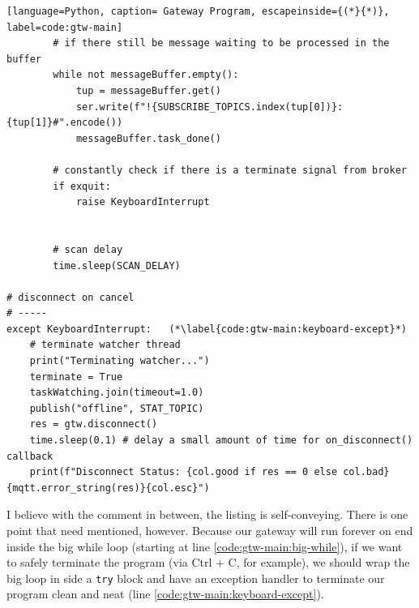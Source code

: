 \begin{lstlisting}[language=Python, caption= Gateway Program, escapeinside={(*}{*)}, label=code:gtw-main]
        # if there still be message waiting to be processed in the buffer
        while not messageBuffer.empty():
            tup = messageBuffer.get()
            ser.write(f"!{SUBSCRIBE_TOPICS.index(tup[0])}:{tup[1]}#".encode())
            messageBuffer.task_done()

        # constantly check if there is a terminate signal from broker
        if exquit:
            raise KeyboardInterrupt


        # scan delay
        time.sleep(SCAN_DELAY)

# disconnect on cancel
# -----
except KeyboardInterrupt:   (*\label{code:gtw-main:keyboard-except}*)
    # terminate watcher thread
    print("Terminating watcher...")
    terminate = True
    taskWatching.join(timeout=1.0)
    publish("offline", STAT_TOPIC)
    res = gtw.disconnect()
    time.sleep(0.1) # delay a small amount of time for on_disconnect() callback
    print(f"Disconnect Status: {col.good if res == 0 else col.bad}{mqtt.error_string(res)}{col.esc}")
\end{lstlisting}
I believe with the comment in between, the listing is self-conveying. There is one point that need mentioned, however. Because our gateway will run forever on end inside the big while loop (starting at line \ref{code:gtw-main:big-while}), if we want to safely terminate the program (via Ctrl + C, for example), we should wrap the big loop in side a \texttt{try} block and have an exception handler to terminate our program clean and neat (line \ref{code:gtw-main:keyboard-except}).

